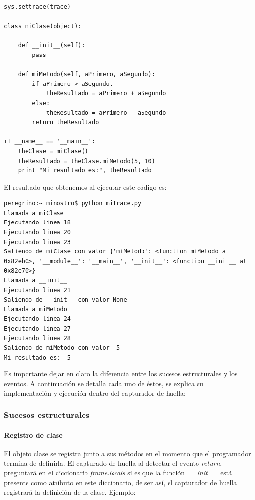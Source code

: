 \documentclass[12pt,legalpaper]{report}
\begin{document}
\begin{itemize}
\begin{singlespace}
\begin{lstlisting}[style=Python]
sys.settrace(trace)

class miClase(object):

    def __init__(self):
        pass
    
    def miMetodo(self, aPrimero, aSegundo):
        if aPrimero > aSegundo:
            theResultado = aPrimero + aSegundo
        else:
            theResultado = aPrimero - aSegundo
        return theResultado

if __name__ == '__main__':
    theClase = miClase()
    theResultado = theClase.miMetodo(5, 10)
    print "Mi resultado es:", theResultado
\end{lstlisting}
\end{singlespace}

El resultado que obtenemos al ejecutar este código es:
\begin{singlespace}
\begin{lstlisting}[style=consola, numbers=none]
peregrino:~ minostro$ python miTrace.py
Llamada a miClase
Ejecutando linea 18
Ejecutando linea 20
Ejecutando linea 23
Saliendo de miClase con valor {'miMetodo': <function miMetodo at 0x82eb0>, '__module__': '__main__', '__init__': <function __init__ at 0x82e70>}
Llamada a __init__
Ejecutando linea 21
Saliendo de __init__ con valor None
Llamada a miMetodo
Ejecutando linea 24
Ejecutando linea 27
Ejecutando linea 28
Saliendo de miMetodo con valor -5
Mi resultado es: -5
\end{lstlisting}
\end{singlespace}
\end{itemize}

Es importante dejar en claro la diferencia entre los sucesos estructurales y los eventos.  A continuación se detalla cada uno de éstos, se explica su implementación y ejecución dentro del capturador de huella:

			\subsubsection{Sucesos estructurales}
			
				\paragraph{Registro de clase \label{registroClase}}

El objeto clase se registra junto a sus métodos en el momento que el programador termina de definirla.  El capturado de huella al detectar el evento \textit{return}, preguntará en el diccionario \textit{frame.locals} si es que la función \textit{\_\_init\_\_} está presente como atributo en este diccionario, de ser así, el capturador de huella registrará la definición de la clase.  Ejemplo:
\end{document}
